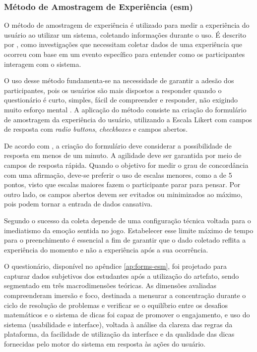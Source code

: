 \subsubsection{Método de Amostragem de Experiência (\texorpdfstring{\acrshort{esm}}{ESM})}
\label{sec:esm_form}
O método de amostragem de experiência é utilizado para medir a experiência do
usuário ao utilizar um sistema, coletando informações durante o uso. É descrito
por \cite{francisco2020esm}, como investigações que necessitam coletar dados de
uma experiência que ocorreu com base em um evento específico para entender como
os participantes interagem com o sistema.

O uso desse método fundamenta-se na necessidade de garantir a adesão dos
participantes, pois os usuários são mais dispostos a responder quando o
questionário é curto, simples, fácil de compreender e responder, não exigindo
muito esforço mental \cite{francisco2020esm}. A aplicação do método consiste na
criação do formulário de amostragem da experiência do usuário, utilizando a
Escala Likert com campos de resposta com \textit{radio buttons}, \textit{checkboxes} e campos
abertos.

De acordo com \cite{francisco2020esm}, a criação do formulário deve considerar a
possibilidade de resposta em menos de um minuto. A agilidade deve ser garantida
por meio de campos de resposta rápida. Quando o objetivo for medir o grau de
concordância com uma afirmação, deve-se preferir o uso de escalas menores, como
a de 5 pontos, visto que escalas maiores fazem o participante parar para pensar.
Por outro lado, os campos abertos devem ser evitados ou minimizados ao máximo,
pois podem tornar a entrada de dados cansativa.

Segundo \cite{francisco2020esm} o sucesso da coleta depende de uma
configuração técnica voltada para o imediatismo da emoção sentida no jogo.
Estabelecer esse limite máximo de tempo para o preenchimento é essencial a fim
de garantir que o dado coletado reflita a experiência do momento e não a
experiência após a sua ocorrência.

O questionário, disponível no apêndice \ref{ap:forms-esm}, foi projetado para
capturar dados subjetivos dos estudantes após a utilização do artefato, sendo
segmentado em três macrodimensões teóricas. As dimensões avaliadas compreenderam
imersão e foco, destinada a mensurar a concentração durante o ciclo de resolução
de problemas e verificar se o equilíbrio entre os desafios matemáticos e o
sistema de dicas foi capaz de promover o engajamento, e uso do sistema
(usabilidade e interface), voltada à análise da clareza das regras da
plataforma, da facilidade de utilização da interface e da qualidade das dicas
fornecidas pelo motor do sistema em resposta às ações do usuário.

